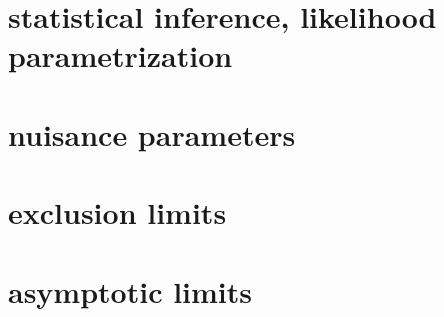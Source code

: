 \section{statistical inference, likelihood parametrization}
\section{ nuisance parameters}
\section{exclusion limits }
\section{asymptotic limits }


 









